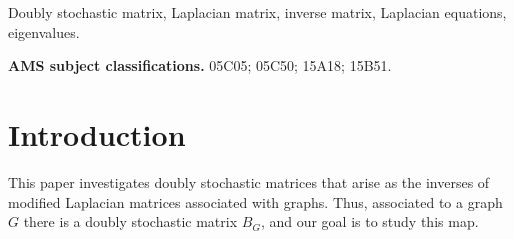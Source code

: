 \documentclass[12pt]{article}
\begin{document}
\begin{abstract}
We consider modified Laplacian matrices of graphs, obtained by adding the identity matrix to the Laplacian matrix $L_G$ of a graph $G$. This results  in a positive definite matrix $\tilde{L}_G$. The inverse of $\tilde{L}_G$ is a doubly stochastic matrix. The goal of this paper is to investigate this inverse matrix and how it depends on properties  of the underlying graph $G$. In particular, we introduce a general monotonicity property for the entries of the inverse, and derive a sharper version for the case of path graphs. Finally, we show that, in the case of a path graph, the entries of the inverse can be expressed in terms of Fibonacci numbers via an $LU$ factorization.
We also establish a lower bound for the diagonal entries of this inverse for a tree as a function of the distances between vertices. Furthermore, we present a simple and efficient  algorithm for computing the inverse when the graph is a tree. Moreover, for a general graph, we show that the diagonal entries of this inverse is strictly largest in each row and column. Finally, we discuss a connection to partial differential equations, such as the heat equation. 
 

 
\end{abstract}

 Doubly stochastic matrix, Laplacian matrix, inverse matrix, Laplacian equations, eigenvalues.




\noindent
	{\bf AMS subject classifications.} 
  05C05; %
	 05C50; %
	 15A18; %
  15B51. %
	 
     

\bigskip\bigskip\bigskip


\section{Introduction} 
\label{sec: introduction}

This paper investigates  doubly stochastic matrices that arise as the inverses of modified Laplacian matrices associated with graphs. Thus, associated to a graph $G$ there is a doubly stochastic matrix $B_G$, and our goal is to study this map. 
\end{document}
